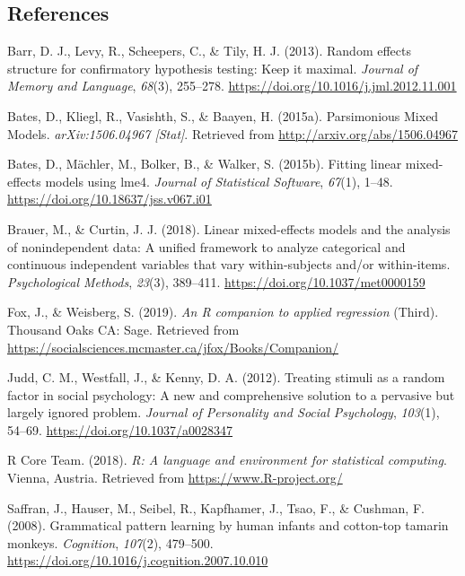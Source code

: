 \begin{appendix}
\hypertarget{references}{%
\subsection{References}\label{references}}

\begingroup
\setlength{\parindent}{-0.5in}
\setlength{\leftskip}{0.5in}

\hypertarget{refs}{}
\leavevmode\hypertarget{ref-barr2013}{}%
Barr, D. J., Levy, R., Scheepers, C., \& Tily, H. J. (2013). Random
effects structure for confirmatory hypothesis testing: Keep it maximal.
\emph{Journal of Memory and Language}, \emph{68}(3), 255--278.
\url{https://doi.org/10.1016/j.jml.2012.11.001}

\leavevmode\hypertarget{ref-bates2015a}{}%
Bates, D., Kliegl, R., Vasishth, S., \& Baayen, H. (2015a). Parsimonious
Mixed Models. \emph{arXiv:1506.04967 {[}Stat{]}}. Retrieved from
\url{http://arxiv.org/abs/1506.04967}

\leavevmode\hypertarget{ref-bates2015}{}%
Bates, D., Mächler, M., Bolker, B., \& Walker, S. (2015b). Fitting
linear mixed-effects models using lme4. \emph{Journal of Statistical
Software}, \emph{67}(1), 1--48.
\url{https://doi.org/10.18637/jss.v067.i01}

\leavevmode\hypertarget{ref-brauer2018}{}%
Brauer, M., \& Curtin, J. J. (2018). Linear mixed-effects models and the
analysis of nonindependent data: A unified framework to analyze
categorical and continuous independent variables that vary
within-subjects and/or within-items. \emph{Psychological Methods},
\emph{23}(3), 389--411. \url{https://doi.org/10.1037/met0000159}

\leavevmode\hypertarget{ref-fox2019}{}%
Fox, J., \& Weisberg, S. (2019). \emph{An R companion to applied
regression} (Third). Thousand Oaks CA: Sage. Retrieved from
\url{https://socialsciences.mcmaster.ca/jfox/Books/Companion/}

\leavevmode\hypertarget{ref-judd2012}{}%
Judd, C. M., Westfall, J., \& Kenny, D. A. (2012). Treating stimuli as a
random factor in social psychology: A new and comprehensive solution to
a pervasive but largely ignored problem. \emph{Journal of Personality
and Social Psychology}, \emph{103}(1), 54--69.
\url{https://doi.org/10.1037/a0028347}

\leavevmode\hypertarget{ref-rcoreteam2018}{}%
R Core Team. (2018). \emph{R: A language and environment for statistical
computing}. Vienna, Austria. Retrieved from
\url{https://www.R-project.org/}

\leavevmode\hypertarget{ref-saffran2008}{}%
Saffran, J., Hauser, M., Seibel, R., Kapfhamer, J., Tsao, F., \&
Cushman, F. (2008). Grammatical pattern learning by human infants and
cotton-top tamarin monkeys. \emph{Cognition}, \emph{107}(2), 479--500.
\url{https://doi.org/10.1016/j.cognition.2007.10.010}


\end{appendix}
